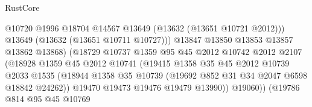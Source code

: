 \begin{lexlean}{RustCore}
\begin{coremodule}
                                            @10720
                                            @1996
                                            @18704
                                            @14567
                                            @13649
                                            (@13632 (@13651 @10721 @2012)))
                                          @13649
                                          (@13632 (@13651 @10711 @10727)))
                                        @13847
                                        @13850
                                        @13853
                                        @13857
                                        @13862
                                        @13868)
                                      (@18729
                                        @10737
                                        @1359
                                        @95
                                        @45
                                        @2012
                                        @10742
                                        @2012
                                        @2107
                                        (@18928
                                          @1359
                                          @45
                                          @2012
                                          @10741
                                          (@19415
                                            @1358
                                            @35
                                            @45
                                            @2012
                                            @10739
                                            @2033
                                            @1535
                                            (@18944
                                              @1358
                                              @35
                                              @10739
                                              (@19692 @852 @31 @34 @2047 @6598 @18842 @24262))
                                            @19470
                                            @19473
                                            @19476
                                            @19479
                                            @13990))
                                        @19060))
                                    (@19786
                                      @814
                                      @95
                                      @45
                                      @10769

\end{coremodule}
\end{lexlean}
